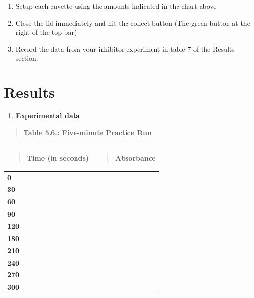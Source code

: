 \documentclass[
  letterpaper,
  DIV=11,
  numbers=noendperiod]{scrreprt}
\newcounter{none} %
\providecommand{\tightlist}{%
  \setlength{\itemsep}{0pt}\setlength{\parskip}{0pt}}
\begin{document}
\begin{enumerate}
\def\labelenumi{\alph{enumi}.}
\item
  Setup each cuvette using the amounts indicated in the chart above
\item
  Close the lid immediately and hit the collect button (The green button
  at the right of the top bar)
\item
  Record the data from your inhibitor experiment in table 7 of the
  Results section.
\end{enumerate}

\section{\texorpdfstring{\textbf{Results}}{Results}}\label{results-1}

\begin{enumerate}
\def\labelenumi{\arabic{enumi})}
\tightlist
\item
  \textbf{Experimental data}
\end{enumerate}

\begin{quote}
\textbf{Table 5.6.: Five-minute Practice Run}
\end{quote}

{\def\LTcaptype{none} %
\begin{longtable}[]{@{}
  >{\centering\arraybackslash}p{}
  >{\raggedright\arraybackslash}p{}@{}}
\toprule\noalign{}
\begin{minipage}[b]{\linewidth}\centering
\begin{quote}
\textbf{Time (in seconds)}
\end{quote}
\end{minipage} & \begin{minipage}[b]{\linewidth}\raggedright
\begin{quote}
\textbf{Absorbance}
\end{quote}
\end{minipage} \\
\midrule\noalign{}
\endhead
\bottomrule\noalign{}
\endlastfoot
\textbf{0} & \\
\textbf{30} & \\
\textbf{60} & \\
\textbf{90} & \\
\textbf{120} & \\
\textbf{180} & \\
\textbf{210} & \\
\textbf{240} & \\
\textbf{270} & \\
\textbf{300} & \\
\end{longtable}
}
\end{document}
